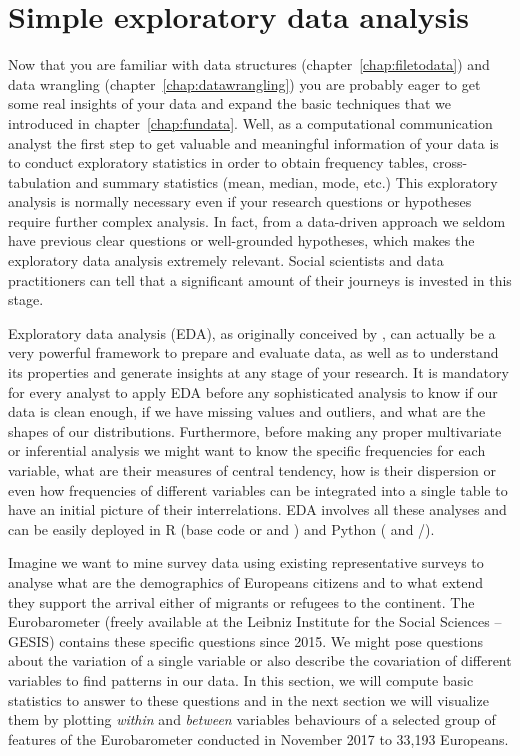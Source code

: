 \section{Simple exploratory data analysis}
\label{sec:simpleeda}

Now that you are familiar with data structures (chapter~\ref{chap:filetodata}) and data wrangling (chapter~\ref{chap:datawrangling}) you are probably eager to get some real insights of your data and expand the basic techniques that we introduced in chapter~\ref{chap:fundata}. Well, as a computational communication analyst the first step to get valuable and meaningful information of your data is to conduct exploratory statistics in order to obtain frequency tables, cross-tabulation and summary statistics (mean, median, mode, etc.)  This exploratory analysis is normally necessary even if your research questions or hypotheses require further complex analysis. In fact, from a data-driven approach we seldom have previous clear questions or well-grounded hypotheses, which makes the exploratory data analysis extremely relevant. Social scientists and data practitioners can tell that a significant amount of their journeys is invested in this stage.

Exploratory data analysis (EDA), as originally conceived by \cite{tukey1977exploratory}, can actually be a very powerful framework to prepare and evaluate data, as well as to understand its properties and generate insights at any stage of your research.  It is mandatory for every analyst to apply EDA before any sophisticated analysis to know if our data is clean enough, if we have missing values and outliers, and what are the shapes of our distributions. Furthermore, before making any proper multivariate or inferential analysis we might want to know the specific frequencies for each variable, what are their measures of central tendency, how is their dispersion or even how frequencies of different variables can be integrated into a single table to have an initial picture of their interrelations. EDA involves all these analyses and can be easily deployed in R (base code or and ) and Python ( and /).

Imagine we want to mine survey data using existing representative surveys to analyse what are the demographics of Europeans citizens and to what extend they support the arrival either of migrants or refugees to the continent. The Eurobarometer (freely available at the Leibniz Institute for the Social Sciences – GESIS) contains these specific questions since 2015. We might pose questions about the variation of a single variable or also describe the covariation of different variables to find patterns in our data. In this section, we will compute basic statistics to answer to these questions and in the next section we will visualize them by plotting \textit{within} and \textit{between} variables behaviours of a selected group of features of the Eurobarometer conducted in November 2017 to 33,193 Europeans. 

